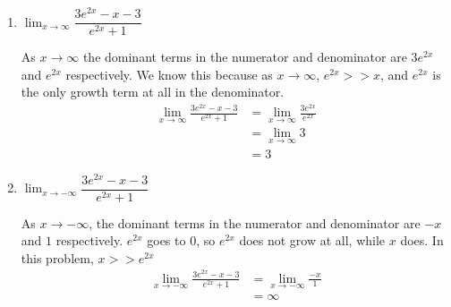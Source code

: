\documentclass{article}
\begin{document}
\begin{enumerate}
\begin{enumerate}
\begin{enumerate}
      \begin{solution}
      As $x\to -\infty$, the dominant term in the denominator
      is $2x^2$. We know this because  $e^x$ goes to 0 while $x^2$ grows in size. $x^2>>e^x$ in this instance. 
        \begin{align*}
          \lim_{x \to -\infty} \frac{x^2}{2x^2 + e^x} &= 
          \lim_{x \to -\infty} \frac{x^2}{2x^2} \\
          &= \lim_{x \to -\infty} \frac{1}{2} \\
          &= \frac{1}{2}
        \end{align*}
      \end{solution}

    \item
      \begin{problem}[\vfill]
        $\displaystyle \lim_{x \to \infty} \dfrac{3 e^{2x} - x - 3}{e^{2x} + 1}$
      \end{problem}

      \begin{solution}
        As $x \to \infty$ the dominant terms in the numerator
        and denominator are $3e^{2x}$ and $e^{2x}$ respectively. We know this because as $x \to \infty$,  $e^{2x}>>x$, and $e^{2x}$ is the only growth term at all in the denominator.
        \begin{align*}
          \lim_{x \to \infty} \frac{3 e^{2x} - x - 3}{e^{2x} + 1} &=
          \lim_{x \to \infty} \frac{3 e^{2x}}{e^{2x}} \\
          &= \lim_{x \to \infty} 3 \\
          &= 3
        \end{align*}
      \end{solution}

    \item
      \begin{problem}[\vfill]
        $\displaystyle \lim_{x \to -\infty} \dfrac{3 e^{2x} - x - 3}{e^{2x} + 1}$
      \end{problem}

      \begin{solution}
        As $x\to-\infty$, the dominant terms in the numerator
        and denominator are $-x$ and $1$ respectively. $e^{2x}$ goes to 0, so $e^{2x}$ does not grow at all, while $x$ does. In this problem, $x>>e^{2x}$
        \begin{align*}
          \lim_{x \to -\infty} \frac{3 e^{2x} - x - 3}{e^{2x} + 1}
          &= \lim_{x \to -\infty} \frac{-x}{1} \\
          &= \infty
        \end{align*}
      \end{solution}


\end{enumerate}
\end{enumerate}
\end{enumerate}
\end{document}
